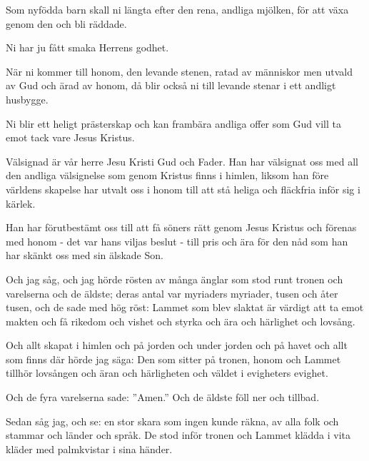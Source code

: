 {Som nyfödda barn skall ni längta efter den rena, andliga mjölken, för att växa genom den och bli räddade.}

Ni har ju fått smaka Herrens godhet.

När ni kommer till honom, den levande stenen, ratad av människor men utvald av Gud och ärad av honom,
då blir också ni till levande stenar i ett andligt husbygge. 

Ni blir ett heligt prästerskap och kan frambära andliga offer som Gud vill ta emot tack vare Jesus Kristus.


{Välsignad är vår herre Jesu Kristi Gud och Fader.} Han har välsignat oss med all den andliga välsignelse som genom Kristus finns i himlen,
liksom han före världens skapelse har utvalt oss i honom till att stå heliga och fläckfria inför sig i kärlek.

Han har förutbestämt oss till att få söners rätt genom Jesus Kristus och förenas med honom - det var hans viljas beslut -
till pris och ära för den nåd som han har skänkt oss med sin älskade Son.


{
Och jag såg, och jag hörde rösten av många änglar som stod runt tronen och varelserna och de äldste; deras antal var myriaders myriader, tusen och åter tusen,
och de sade med hög röst: Lammet som blev slaktat är värdigt att ta emot makten och få rikedom och vishet och styrka och ära och härlighet och lovsång.}

Och allt skapat i himlen och på jorden och under jorden och på havet och allt som finns där hörde jag säga: Den som sitter på tronen, honom och Lammet tillhör lovsången och äran och härligheten och väldet i evigheters evighet.

Och de fyra varelserna sade: ''Amen.'' Och de äldste föll ner och tillbad.


{
Sedan såg jag, och se: en stor skara som ingen kunde räkna, av alla folk och stammar och länder och språk. De stod inför tronen och Lammet klädda i vita kläder med palmkvistar i sina händer.}

